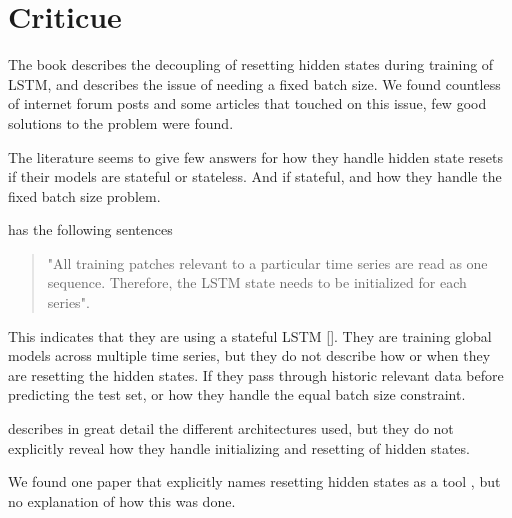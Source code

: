 
\section{Criticue}
\label{section:RelatedWork:Criticue}
The book \cite{Bharadi2021} describes the decoupling of resetting hidden
states during training of LSTM, and describes the issue of
needing a fixed batch size. We found countless of internet forum posts
and some articles that touched on this issue, few good solutions
to the problem were found.

The literature seems to give few answers for how they handle hidden state
resets if their models are stateful or stateless. And if stateful,
and how they handle the fixed batch size problem.

\cite{Bandara2017} has the following sentences
\begin{quotation}
  "All training patches relevant to a particular time series are read as one
  sequence. Therefore, the LSTM state needs to be initialized for each
  series".

\end{quotation}
This indicates that they are using a stateful LSTM [].
They are training global models across multiple time series, but they do not
describe how or when they are resetting the hidden states.
If they pass through historic relevant data before predicting
the test set, or how they handle the equal batch size constraint.

\cite{Hewamalage2021} describes in great detail the different architectures used,
but they do not explicitly reveal how they handle initializing and resetting
of hidden states.

We found one paper that explicitly names resetting hidden states
as a tool \cite{Smyl2020}, but no explanation of how this was done.

